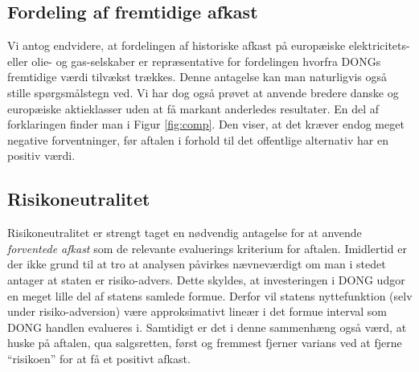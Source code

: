 \documentclass{article}
\begin{document}
\begin{appendices}


\subsection{Fordeling af fremtidige afkast}

Vi antog endvidere, at fordelingen af historiske afkast på europæiske elektricitets- eller olie- og gas-selskaber er repræsentative for fordelingen hvorfra DONGs fremtidige værdi tilvækst trækkes. Denne antagelse kan man naturligvis også stille spørgsmålstegn ved. Vi har dog også prøvet at anvende bredere danske og europæiske aktieklasser uden at få markant anderledes resultater. En del af forklaringen finder man i Figur \ref{fig:comp}. Den viser, at det kræver endog meget negative forventninger, før aftalen i forhold til det offentlige alternativ har en positiv værdi.


\subsection{Risikoneutralitet}

Risikoneutralitet er strengt taget en nødvendig antagelse for at anvende \emph{forventede afkast} som de relevante evaluerings kriterium for aftalen. Imidlertid er der ikke grund til at tro at analysen påvirkes nævneværdigt om man i stedet antager at staten er risiko-advers. Dette skyldes, at investeringen i DONG udgor en meget lille del af statens samlede formue. Derfor vil statens nyttefunktion (selv under risiko-adversion) være approksimativt lineær i det formue interval som DONG handlen evalueres i. Samtidigt er det i denne sammenhæng også værd, at huske på aftalen, qua salgsretten, først og fremmest fjerner varians ved at fjerne \enquote{risikoen} for at få et positivt afkast. 



\end{appendices}
\end{document}
